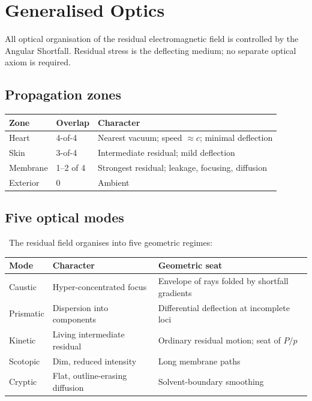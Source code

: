 \section{Generalised Optics}
\label{sec:optics}

All optical organisation of the residual electromagnetic field is controlled by
the Angular Shortfall. Residual stress is the deflecting medium; no separate
optical axiom is required.

\subsection{Propagation zones}
\begin{center}
\begin{tabular}{lll}
\toprule
Zone & Overlap & Character \\
\midrule
Heart & 4-of-4 & Nearest vacuum; speed $\approx c$; minimal deflection \\
Skin & 3-of-4 & Intermediate residual; mild deflection \\
Membrane & 1--2 of 4 & Strongest residual; leakage, focusing, diffusion \\
Exterior & 0 & Ambient \\
\bottomrule
\end{tabular}
\end{center}

\subsection{Five optical modes}
\conceptual\ The residual field organises into five geometric regimes:

\begin{center}
\begin{tabular}{lll}
\toprule
Mode & Character & Geometric seat \\
\midrule
Caustic & Hyper-concentrated focus & Envelope of rays folded by shortfall gradients \\
Prismatic & Dispersion into components & Differential deflection at incomplete loci \\
Kinetic & Living intermediate residual & Ordinary residual motion; seat of $P/p$ \\
Scotopic & Dim, reduced intensity & Long membrane paths \\
Cryptic & Flat, outline-erasing diffusion & Solvent-boundary smoothing \\
\bottomrule
\end{tabular}
\end{center}

